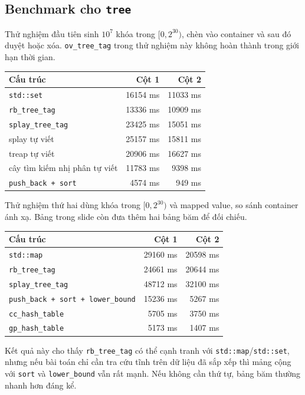\documentclass[11pt]{article}
\begin{document}
\subsection{Benchmark cho \texorpdfstring{\texttt{tree}}{tree}}

Thử nghiệm đầu tiên sinh $10^7$ khóa trong $[0,2^{30})$, chèn vào container và
sau đó duyệt hoặc xóa. \texttt{ov\_tree\_tag} trong thử nghiệm này không hoàn
thành trong giới hạn thời gian.

\begin{center}
\small
\begin{tabular}{|l|r|r|}
\hline
Cấu trúc & Cột 1 & Cột 2 \\
\hline
\texttt{std::set} & 16154 ms & 11033 ms \\
\texttt{rb\_tree\_tag} & 13336 ms & 10909 ms \\
\texttt{splay\_tree\_tag} & 23425 ms & 15051 ms \\
splay tự viết & 25157 ms & 15811 ms \\
treap tự viết & 20906 ms & 16627 ms \\
cây tìm kiếm nhị phân tự viết & 11783 ms & 9398 ms \\
\texttt{push\_back + sort} & 4574 ms & 949 ms \\
\hline
\end{tabular}
\end{center}

Thử nghiệm thứ hai dùng khóa trong $[0,2^{30})$ và mapped value, so sánh
container ánh xạ. Bảng trong slide còn đưa thêm hai bảng băm để đối chiếu.

\begin{center}
\small
\begin{tabular}{|l|r|r|}
\hline
Cấu trúc & Cột 1 & Cột 2 \\
\hline
\texttt{std::map} & 29160 ms & 20598 ms \\
\texttt{rb\_tree\_tag} & 24661 ms & 20644 ms \\
\texttt{splay\_tree\_tag} & 48712 ms & 32100 ms \\
\texttt{push\_back + sort + lower\_bound} & 15236 ms & 5267 ms \\
\texttt{cc\_hash\_table} & 5705 ms & 3750 ms \\
\texttt{gp\_hash\_table} & 5173 ms & 1407 ms \\
\hline
\end{tabular}
\end{center}

Kết quả này cho thấy \texttt{rb\_tree\_tag} có thể cạnh tranh với
\texttt{std::map}/\texttt{std::set}, nhưng nếu bài toán chỉ cần tra cứu tĩnh
trên dữ liệu đã sắp xếp thì mảng cộng với \texttt{sort} và
\texttt{lower\_bound} vẫn rất mạnh. Nếu không cần thứ tự, bảng băm thường nhanh
hơn đáng kể.
\end{document}
